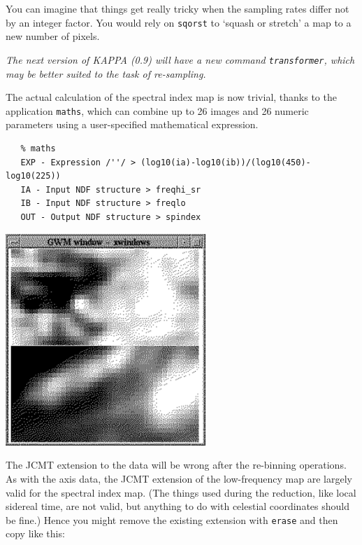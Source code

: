 \documentclass[11pt]{article}
\newcommand{\htmladdimg}[1]{}
\newenvironment{latexonly}{}{}
\newcommand{\xref}[3]{#1}
\begin{document}
   You can imagine that things get really tricky when the sampling rates
   differ not by an integer factor. You would rely on
{\tt \xref{sqorst}{sun95}{SQORST}}
   to `squash or stretch' a map to a new number of pixels.

   {\it The next version of KAPPA (0.9) will have a new command\/
{\tt \xref{transformer}{sun95}{TRANSFORMER}},
   which may be better suited to the task of re-sampling.}

   The actual calculation of the spectral index map is now trivial,
   thanks to the application
{\tt \xref{maths}{sun95}{MATHS}},
   which can combine up to 26 images and 26 numeric parameters using a
   user-specified mathematical expression.

\begin{verbatim}
   % maths
   EXP - Expression /''/ > (log10(ia)-log10(ib))/(log10(450)-log10(225))
   IA - Input NDF structure > freqhi_sr
   IB - Input NDF structure > freqlo
   OUT - Output NDF structure > spindex
\end{verbatim}

\begin{latexonly}
\begin{center}
\leavevmode\includegraphics[height=80mm]{sc1_spindex2}
\end{center}
\end{latexonly}
\htmladdimg{addon/spindex2.gif}

   The JCMT extension to the data
   will be wrong after the re-binning operations. As with the axis data,
   the JCMT extension of the low-frequency map are largely valid
   for the spectral index map. (The things used during the reduction,
   like local sidereal time, are not valid, but anything to do with
   celestial coordinates should be fine.) Hence you might remove the
   existing extension with
{\tt \xref{erase}{sun95}{ERASE}}
   and then copy like this:
\end{document}
